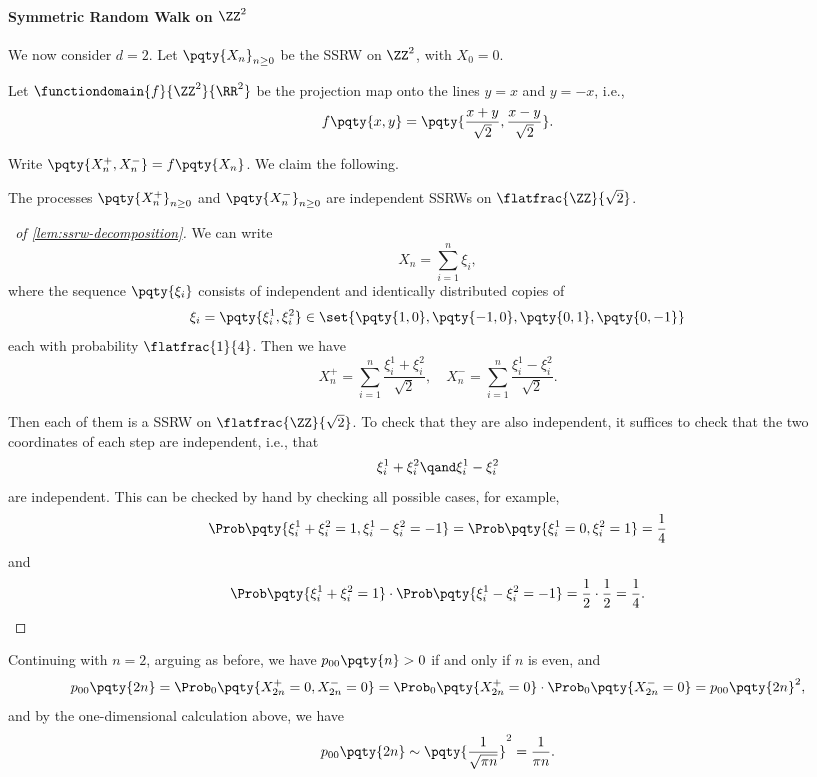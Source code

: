 \paragraph{Symmetric Random Walk on \(\ZZ^2\)} We now consider \(d = 2\). Let \(\pqty{X_n}_{n \geq 0}\) be the SSRW on \(\ZZ^2\), with \(X_0 = 0\).
        
Let \(\functiondomain{f}{\ZZ^2}{\RR^2}\) be the projection map onto the lines \(y = x\) and \(y = -x\), i.e.,
\[
    f\pqty{x, y} = \pqty{\frac{x + y}{\sqrt{2}}, \frac{x - y}{\sqrt{2}}}.
\]

Write \(\pqty{X_n^+, X_n^-} = f\pqty{X_n}\). We claim the following.

\begin{lemma}
    \label{lem:ssrw-decomposition}%
    The processes \(\pqty{X_n^+}_{n \geq 0}\) and \(\pqty{X_n^-}_{n \geq 0}\) are independent SSRWs on \(\flatfrac{\ZZ}{\sqrt{2}}\).
\end{lemma}

\begin{proof}[\proofname\ of \autoref{lem:ssrw-decomposition}]
    We can write
    \[
        X_n = \sum_{i = 1}^{n} \xi_i,
    \]
    where the sequence \(\pqty{\xi_i}\) consists of independent and identically distributed copies of
    \[
        \xi_i = \pqty{\xi_i^1, \xi_i^2} \in \set{\pqty{1, 0}, \pqty{-1, 0}, \pqty{0, 1}, \pqty{0, -1}}
    \]
    each with probability \(\flatfrac{1}{4}\). Then we have
    \[
        X_n^+ = \sum_{i = 1}^{n} \frac{\xi_i^1 + \xi_i^2}{\sqrt{2}}, \quad X_n^- = \sum_{i = 1}^{n} \frac{\xi_i^1 - \xi_i^2}{\sqrt{2}}.
    \]

    Then each of them is a SSRW on \(\flatfrac{\ZZ}{\sqrt{2}}\). To check that they are also independent, it suffices to check that the two coordinates of each step are independent, i.e., that
    \[
        \xi_i^1 + \xi_i^2 \qand \xi_i^1 - \xi_i^2
    \]
    are independent. This can be checked by hand by checking all possible cases, for example,
    \[
        \Prob\pqty{\xi_i^1 + \xi_i^2 = 1, \xi_i^1 - \xi_i^2 = -1} = \Prob\pqty{\xi_i^1 = 0, \xi_i^2 = 1} = \frac{1}{4}
    \]
    and
    \[
       \Prob\pqty{\xi_i^1 + \xi_i^2 = 1} \cdot \Prob\pqty{\xi_i^1 - \xi_i^2 = -1} = \frac{1}{2} \cdot \frac{1}{2} = \frac{1}{4}.
    \]
\end{proof}

Continuing with \(n = 2\), arguing as before, we have \(p_{00}\pqty{n} > 0\) if and only if \(n\) is even, and
\[
    p_{00} \pqty{2n} = \Prob_0 \pqty{X_{2n}^+ = 0, X_{2n}^- = 0} = \Prob_0 \pqty{X_{2n}^+ = 0} \cdot \Prob_0 \pqty{X_{2n}^- = 0} = p_{00}\pqty{2n}^2,
\]
and by the one-dimensional calculation above, we have
\[
    p_{00} \pqty{2n} \sim \pqty{\frac{1}{\sqrt{\pi n}}}^2 = \frac{1}{\pi n}.
\]

